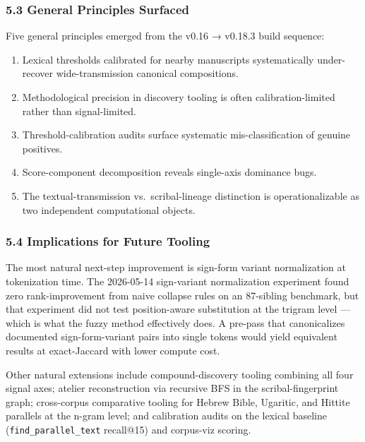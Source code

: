 \documentclass[
  11pt,
  letterpaper,
]{article}
\providecommand{\tightlist}{%
  \setlength{\itemsep}{0pt}\setlength{\parskip}{0pt}}
\begin{document}
\subsubsection{5.3 General Principles
Surfaced}\label{general-principles-surfaced}

Five general principles emerged from the v0.16 → v0.18.3 build sequence:

\begin{enumerate}
\def\labelenumi{\arabic{enumi}.}
\tightlist
\item
  Lexical thresholds calibrated for nearby manuscripts systematically
  under-recover wide-transmission canonical compositions.
\item
  Methodological precision in discovery tooling is often
  calibration-limited rather than signal-limited.
\item
  Threshold-calibration audits surface systematic mis-classification of
  genuine positives.
\item
  Score-component decomposition reveals single-axis dominance bugs.
\item
  The textual-transmission vs.~scribal-lineage distinction is
  operationalizable as two independent computational objects.
\end{enumerate}

\subsubsection{5.4 Implications for Future
Tooling}\label{implications-for-future-tooling}

The most natural next-step improvement is sign-form variant
normalization at tokenization time. The 2026-05-14 sign-variant
normalization experiment found zero rank-improvement from naive collapse
rules on an 87-sibling benchmark, but that experiment did not test
position-aware substitution at the trigram level --- which is what the
fuzzy method effectively does. A pre-pass that canonicalizes documented
sign-form-variant pairs into single tokens would yield equivalent
results at exact-Jaccard with lower compute cost.

Other natural extensions include compound-discovery tooling combining
all four signal axes; atelier reconstruction via recursive BFS in the
scribal-fingerprint graph; cross-corpus comparative tooling for Hebrew
Bible, Ugaritic, and Hittite parallels at the n-gram level; and
calibration audits on the lexical baseline
(\texttt{find\_parallel\_text} recall@15) and corpus-viz scoring.
\end{document}
